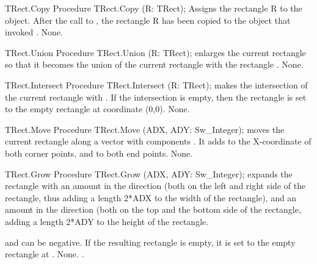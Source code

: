 \begin{procedure}{TRect.Copy}
\Declaration     
Procedure TRect.Copy (R: TRect);
\Description
Assigns the rectangle R to the object. After the call to , the
rectangle R has been copied to the object that invoked .
\Errors
None.
\SeeAlso
{}
\end{procedure}


\begin{procedure}{TRect.Union}
\Declaration
Procedure TRect.Union (R: TRect);
\Description
{} enlarges the current rectangle so that it becomes the union
of the current rectangle with the rectangle .
\Errors
None.
\SeeAlso
{}
\end{procedure}


\begin{procedure}{TRect.Intersect}
\Declaration
Procedure TRect.Intersect (R: TRect);
\Description
{} makes the intersection of the current rectangle with
. If the intersection is empty, then the rectangle is set to the empty
rectangle at coordinate (0,0).
\Errors
None.
\SeeAlso
{}
\end{procedure}


\begin{procedure}{TRect.Move}
\Declaration
Procedure TRect.Move (ADX, ADY: Sw\_Integer);
\Description
{} moves the current rectangle along a vector with components
. It adds  to the X-coordinate of both corner
points, and  to both end points.
\Errors
None.
\SeeAlso
{}
\end{procedure}


\begin{procedure}{TRect.Grow}
\Declaration
Procedure TRect.Grow (ADX, ADY: Sw\_Integer);
\Description
{} expands the rectangle with an amount  in the 
direction (both on the left and right side of the rectangle, thus adding a 
length 2*ADX to the width of the rectangle), and an amount  in 
the  direction (both on the top and the bottom side of the rectangle,
adding a length 2*ADY to the height of the rectangle. 

 and  can be negative. If the resulting rectangle is empty, it is set 
to the empty rectangle at .
\Errors
None.
\SeeAlso
{}.
\end{procedure}


